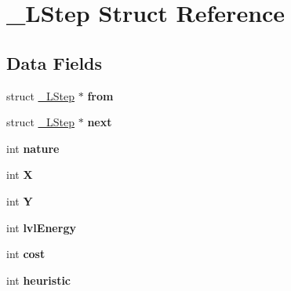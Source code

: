 \hypertarget{struct___l_step}{}\section{\+\_\+\+L\+Step Struct Reference}
\label{struct___l_step}
\subsection*{Data Fields}
\begin{DoxyCompactItemize}
\item 
struct \hyperlink{struct___l_step}{\+\_\+\+L\+Step} $\ast$ {\bfseries from}\hypertarget{struct___l_step_ac26cd8182373efaf743f0afc78124c9c}{}\label{struct___l_step_ac26cd8182373efaf743f0afc78124c9c}

\item 
struct \hyperlink{struct___l_step}{\+\_\+\+L\+Step} $\ast$ {\bfseries next}\hypertarget{struct___l_step_aec049652ca71b0108f37877e247b710c}{}\label{struct___l_step_aec049652ca71b0108f37877e247b710c}

\item 
int {\bfseries nature}\hypertarget{struct___l_step_a7e11726fa8adbf489710249a6685d939}{}\label{struct___l_step_a7e11726fa8adbf489710249a6685d939}

\item 
int {\bfseries X}\hypertarget{struct___l_step_a80c0944640e62d3ed6c5419c1bcc0c88}{}\label{struct___l_step_a80c0944640e62d3ed6c5419c1bcc0c88}

\item 
int {\bfseries Y}\hypertarget{struct___l_step_aa482c4cc86a24474e4fb19b5b5978778}{}\label{struct___l_step_aa482c4cc86a24474e4fb19b5b5978778}

\item 
int {\bfseries lvl\+Energy}\hypertarget{struct___l_step_a28708c211dc7281c07d30444d75e5e7c}{}\label{struct___l_step_a28708c211dc7281c07d30444d75e5e7c}

\item 
int {\bfseries cost}\hypertarget{struct___l_step_a66700f11d42fee2413e58dbf49c43ee1}{}\label{struct___l_step_a66700f11d42fee2413e58dbf49c43ee1}

\item 
int {\bfseries heuristic}\hypertarget{struct___l_step_a266b59afb2a9e30cb84c2b14388fb5fe}{}\label{struct___l_step_a266b59afb2a9e30cb84c2b14388fb5fe}

\end{DoxyCompactItemize}


